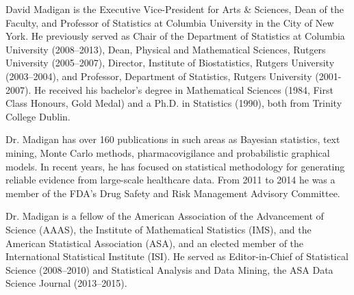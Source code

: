 \hrulefill

\small David Madigan is the Executive Vice-President for Arts \& Sciences,
Dean of the Faculty, and Professor of Statistics at Columbia
University in the City of New York. He previously served as Chair of
the Department of Statistics at Columbia University (2008--2013), Dean,
Physical and Mathematical Sciences, Rutgers University (2005--2007),
Director, Institute of Biostatistics, Rutgers University (2003--2004),
and Professor, Department of Statistics, Rutgers University
(2001-2007).  He received his bachelor's degree in Mathematical
Sciences (1984, First Class Honours, Gold Medal) and a Ph.D. in
Statistics (1990), both from Trinity College Dublin.

Dr. Madigan has over 160 publications in such areas as Bayesian statistics,
text mining, Monte Carlo methods, pharmacovigilance and probabilistic
graphical models. In recent years, he has focused on statistical
methodology for generating reliable evidence from large-scale
healthcare data. From 2011 to 2014 he was a member of the FDA's
Drug Safety and Risk Management Advisory Committee.

Dr. Madigan is a fellow of the American Association of the Advancement
of Science (AAAS), the Institute of Mathematical Statistics (IMS), and
the American Statistical Association (ASA), and an elected member of
the International Statistical Institute (ISI).  He served as
Editor-in-Chief of Statistical Science (2008--2010) and Statistical
Analysis and Data Mining, the ASA Data Science Journal (2013--2015).

\normalsize

